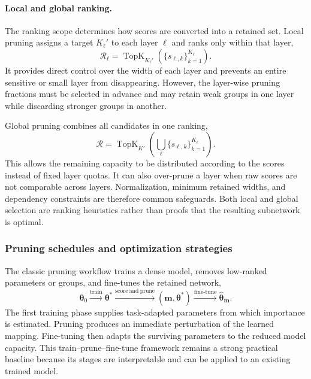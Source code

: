 \documentclass[
    a4paper,
    12pt,
    titlepage,
    bibliography=totoc,
    twoside=on,
    parskip=false,
    numbers=noenddot,
    cleardoublepage=empty,
    DIV=12,
    BCOR=12.0mm,
    headheight=36pt,
    headings=openright
]{scrreprt}
\begin{document}
\paragraph{Local and global ranking.}
The ranking scope determines how scores are converted into a retained set. Local pruning assigns a target $K_\ell'$ to each layer $\ell$ and ranks only within that layer,
\begin{equation}
    \mathcal R_\ell
    =
    \operatorname{TopK}_{K_\ell'}
    \left(
        \{s_{\ell,k}\}_{k=1}^{K_\ell}
    \right).
    \label{eq:fundamental_local_pruning}
\end{equation}
It provides direct control over the width of each layer and prevents an entire sensitive or small layer from disappearing. However, the layer-wise pruning fractions must be selected in advance and may retain weak groups in one layer while discarding stronger groups in another.

Global pruning combines all candidates in one ranking,
\begin{equation}
    \mathcal R
    =
    \operatorname{TopK}_{K'}
    \left(
        \bigcup_{\ell}
        \{s_{\ell,k}\}_{k=1}^{K_\ell}
    \right).
    \label{eq:fundamental_global_pruning}
\end{equation}
This allows the remaining capacity to be distributed according to the scores instead of fixed layer quotas. It can also over-prune a layer when raw scores are not comparable across layers. Normalization, minimum retained widths, and dependency constraints are therefore common safeguards. Both local and global selection are ranking heuristics rather than proofs that the resulting subnetwork is optimal.\autocite{blalockWhatStateNeural2020,chengSurveyDeepNeural2024}

\subsubsection{Pruning schedules and optimization strategies}

The classic pruning workflow trains a dense model, removes low-ranked parameters or groups, and fine-tunes the retained network,
\begin{equation}
    \boldsymbol{\theta}_0
    \xrightarrow{\mathrm{train}}
    \boldsymbol{\theta}^{*}
    \xrightarrow{\mathrm{score\ and\ prune}}
    \left(\boldsymbol{m},\boldsymbol{\theta}^{*}\right)
    \xrightarrow{\mathrm{fine\mbox{-}tune}}
    \widehat{\boldsymbol{\theta}}_{\boldsymbol{m}}.
    \label{eq:fundamental_classic_pruning}
\end{equation}
The first training phase supplies task-adapted parameters from which importance is estimated. Pruning produces an immediate perturbation of the learned mapping. Fine-tuning then adapts the surviving parameters to the reduced model capacity. This train--prune--fine-tune framework remains a strong practical baseline because its stages are interpretable and can be applied to an existing trained model.\autocite{hanLearningBothWeights2015}
\end{document}
